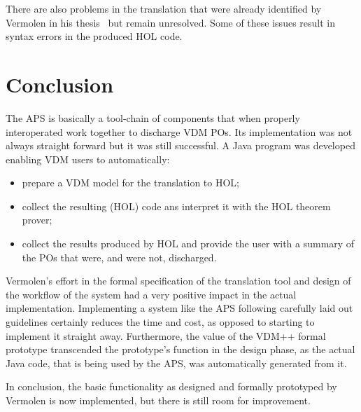\documentclass[]{article}
\begin{document}
There are also problems in the translation that were already identified by Vermolen in his thesis~\cite[Section 7.3]{Vermolen07} but remain unresolved.
Some of these issues result in syntax errors in the produced HOL code.

\section{Conclusion}
\label{sec:conclusion}

The APS is basically a tool-chain of components that when properly interoperated work together to discharge VDM POs.
Its implementation was not always straight forward but it was still successful.
A Java program was developed enabling VDM users to automatically:
\begin{itemize}
  \item	prepare a VDM model for the translation to HOL;
  \item collect the resulting (HOL) code ans interpret it with the HOL theorem prover;
  \item collect the results produced by HOL and provide the user with a summary of the POs that were, and were not, discharged.
\end{itemize}

Vermolen's effort in the formal specification of the translation tool and design of the workflow of the system had a very positive impact in the actual implementation.
Implementing a system like the APS following carefully laid out guidelines certainly reduces the time and cost, as opposed to starting to implement it straight away.
Furthermore, the value of the VDM++ formal prototype transcended the prototype's function in the design phase, as the actual Java code, that is being used by the APS, was automatically generated from it.

In conclusion, the basic functionality as designed and formally prototyped by Vermolen is now implemented, but there is still room for improvement.



\end{document}

